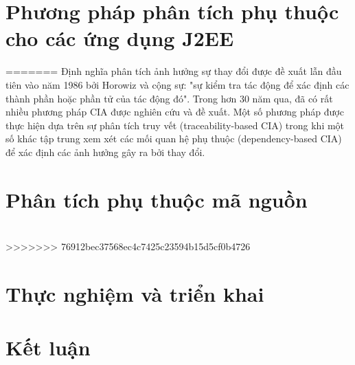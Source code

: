 \documentclass[12pt]{report}
\begin{document}
\chapter{Phương pháp phân tích phụ thuộc cho các ứng dụng J2EE}
=======
Định nghĩa phân tích ảnh hưởng sự thay đổi được đề xuất lẫn đầu tiên vào năm 1986 bởi Horowiz và cộng sự: "sự kiểm tra tác động để xác định các thành phần hoặc phần tử của tác động đó". Trong hơn 30 năm qua, đã có rất nhiều phương pháp CIA được nghiên cứu và đề xuất. Một số phương pháp được thực hiện dựa trên sự phân tích truy vết (traceability-based CIA) trong khi một số khác tập trung xem xét các mối quan hệ phụ thuộc (dependency-based CIA) để xác định các ảnh hưởng gây ra bởi thay đổi.
\chapter{Phân tích phụ thuộc mã nguồn}
\chapter{}
>>>>>>> 76912bec37568ec4c7425c23594b15d5cf0b4726
\chapter{Thực nghiệm và triển khai}
\chapter{Kết luận}
\end{document}
